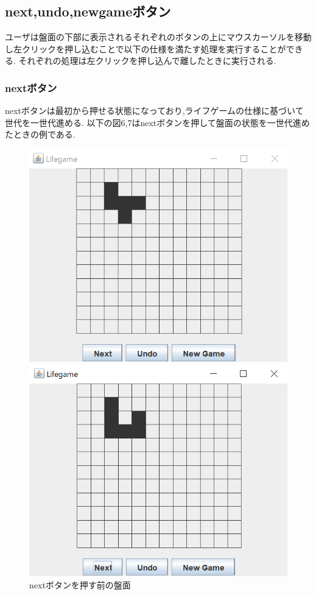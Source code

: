 \documentclass[dvipdfmx]{jarticle}
\begin{document}
\subsection{next,undo,newgameボタン}
ユーザは盤面の下部に表示されるそれぞれのボタンの上にマウスカーソルを移動し左クリックを押し込むことで以下の仕様を満たす処理を実行することができる.
それぞれの処理は左クリックを押し込んで離したときに実行される.
\subsubsection{nextボタン}
nextボタンは最初から押せる状態になっており,ライフゲームの仕様に基づいて世代を一世代進める.
以下の図6,7はnextボタンを押して盤面の状態を一世代進めたときの例である.
\begin{figure}[htbp]
  \begin{minipage}[b]{0.45\linewidth}
    \centering
    \includegraphics[keepaspectratio, scale=0.35]{before_next.png}
    \caption{nextボタンを押す前の盤面}
  \end{minipage}
  \begin{minipage}[b]{0.45\linewidth}
    \centering
    \includegraphics[keepaspectratio, scale=0.35]{after_next.png}

\end{minipage}
\end{figure}
\end{document}

